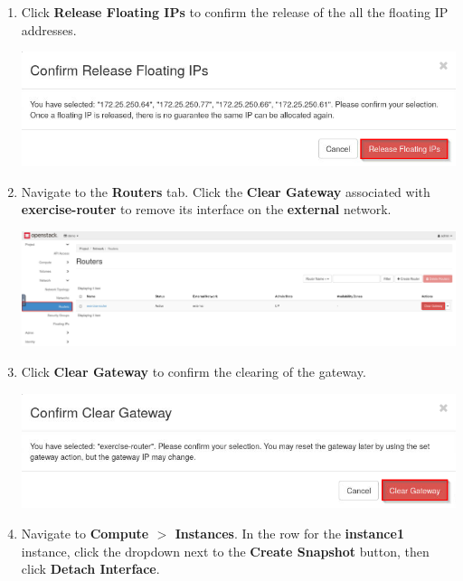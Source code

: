 \documentclass[letterpaper, 12pt]{article}
\begin{document}
\begin{enumerate}
    \item Click \textbf{Release Floating IPs} to confirm the release of the all the floating IP addresses.
    
    \begin{center}
        \includegraphics[width=\linewidth]{images/part4/step24.png}
    \end{center}

    \item Navigate to the \textbf{Routers} tab. Click the \textbf{Clear Gateway} associated with
    \textbf{exercise-router} to remove its interface on the \textbf{external} network.

    \begin{center}
        \includegraphics[width=\linewidth]{images/part4/step25.png}
    \end{center}
    
    \item Click \textbf{Clear Gateway} to confirm the clearing of the gateway.
    
    \begin{center}
        \includegraphics[width=\linewidth]{images/part4/step26.png}
    \end{center}

    \item Navigate to \textbf{Compute $>$ Instances}. In the row for the \textbf{instance1} instance, click the
    dropdown next to the \textbf{Create Snapshot} button, then click \textbf{Detach Interface}.


\end{enumerate}
\end{document}
